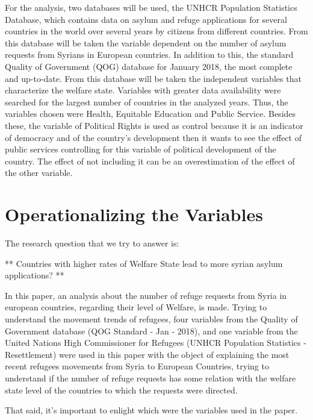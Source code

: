 \documentclass[]{elsarticle} %
\begin{document}
For the analysis, two databases will be used, the UNHCR Population
Statistics Database, which contains data on asylum and refuge
applications for several countries in the world over several years by
citizens from different countries. From this database will be taken the
variable dependent on the number of asylum requests from Syrians in
European countries. In addition to this, the standard Quality of
Government (QOG) database for January 2018, the most complete and
up-to-date. From this database will be taken the independent variables
that characterize the welfare state. Variables with greater data
availability were searched for the largest number of countries in the
analyzed years. Thus, the variables chosen were Health, Equitable
Education and Public Service. Besides these, the variable of Political
Rights is used as control because it is an indicator of democracy and of
the country's development then it wants to see the effect of public
services controlling for this variable of political development of the
country. The effect of not including it can be an overestimation of the
effect of the other variable.

\section{Operationalizing the
Variables}\label{operationalizing-the-variables}

The research question that we try to answer is:

** Countries with higher rates of Welfare State lead to more syrian
asylum applications? **

In this paper, an analysis about the number of refuge requests from
Syria in european countries, regarding their level of Welfare, is made.
Trying to understand the movement trends of refugees, four variables
from the Quality of Government database (QOG Standard - Jan - 2018), and
one variable from the United Nations High Commissioner for Refugees
(UNHCR Population Statistics - Resettlement) were used in this paper
with the object of explaining the most recent refugees movements from
Syria to European Countries, trying to understand if the number of
refuge requests has some relation with the welfare state level of the
countries to which the requests were directed.

That said, it's important to enlight which were the variables used in
the paper.
\end{document}

